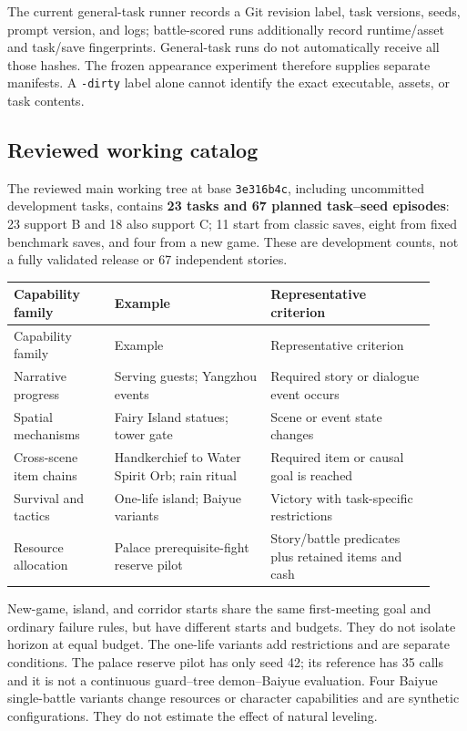\documentclass[11pt,a4paper]{article}
\begin{document}
The current general-task runner records a Git revision label, task versions, seeds, prompt version, and logs; battle-scored runs additionally record runtime/asset and task/save fingerprints. General-task runs do not automatically receive all those hashes. The frozen appearance experiment therefore supplies separate manifests. A \texttt{-\allowbreak{}dirty} label alone cannot identify the exact executable, assets, or task contents.

\subsection{\texorpdfstring{Reviewed working catalog}{Reviewed working catalog}}

The reviewed main working tree at base \texttt{3e316b4c}, including uncommitted development tasks, contains \textbf{23 tasks and 67 planned task--seed episodes}: 23 support B and 18 also support C; 11 start from classic saves, eight from fixed benchmark saves, and four from a new game. These are development counts, not a fully validated release or 67 independent stories.

{\small\setlength{\tabcolsep}{3pt}
\begin{longtable}{@{}>{\RaggedRight\arraybackslash}p{0.22\linewidth}>{\RaggedRight\arraybackslash}p{0.34\linewidth}>{\RaggedRight\arraybackslash}p{0.36\linewidth}@{}}
\toprule
Capability family & Example & Representative criterion \\
\midrule\endfirsthead
\toprule
Capability family & Example & Representative criterion \\
\midrule\endhead
\bottomrule\endfoot
Narrative progress & Serving guests; Yangzhou events & Required story or dialogue event occurs \\
Spatial mechanisms & Fairy Island statues; tower gate & Scene or event state changes \\
Cross-scene item chains & Handkerchief to Water Spirit Orb; rain ritual & Required item or causal goal is reached \\
Survival and tactics & One-life island; Baiyue variants & Victory with task-specific restrictions \\
Resource allocation & Palace prerequisite-fight reserve pilot & Story/battle predicates plus retained items and cash \\
\end{longtable}
}

New-game, island, and corridor starts share the same first-meeting goal and ordinary failure rules, but have different starts and budgets. They do not isolate horizon at equal budget. The one-life variants add restrictions and are separate conditions. The palace reserve pilot has only seed 42; its reference has 35 calls and it is not a continuous guard--tree demon--Baiyue evaluation. Four Baiyue single-battle variants change resources or character capabilities and are synthetic configurations. They do not estimate the effect of natural leveling.
\end{document}
